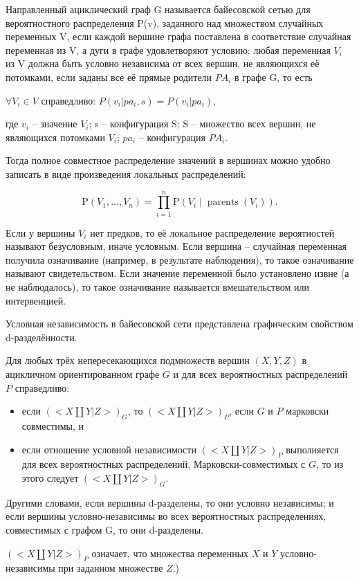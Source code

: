 Направленный ациклический граф G называется байесовской сетью для вероятностного распределения P(v), заданного над множеством случайных переменных V, если каждой вершине графа поставлена в соответствие случайная переменная из V, а дуги в графе удовлетворяют условию: любая переменная \(V_i\) из V должна быть условно независима от всех вершин, не являющихся её потомками, если заданы все её прямые родители \(PA_i\) в графе G, то есть

\(\forall V_i \in V\) справедливо: \(P(v_i|pa_i,s) = P(v_i|pa_i)\),

где \(v_i\) -- значение \(V_i\); s -- конфигурация S; S -- множество всех вершин, не являющихся потомками \(V_i\); \(pa_i\) -- конфигурация \(PA_i\).

Тогда полное совместное распределение значений в вершинах можно удобно записать в виде произведения локальных распределений:

\[ \mathrm P(V_1, \ldots, V_n) = \prod_{i=1}^n \mathrm P(V_i \mid \operatorname{parents}(V_i)). \]

Если у вершины \(V_i\) нет предков, то её локальное распределение вероятностей называют безусловным, иначе условным. Если вершина -- случайная переменная получила означивание (например, в результате наблюдения), то такое означивание называют свидетельством. Если значение переменной было установлено извне (а не наблюдалось), то такое означивание называется вмешательством или интервенцией.

Условная независимость в байесовской сети представлена графическим свойством d-разделённости.

Для любых трёх непересекающихся подмножеств вершин \( (X, Y, Z) \) в ацикличном ориентированном графе \( G \) и для всех вероятностных распределений \( P \) справедливо:
\begin{itemize}
\item если \( (<X \amalg Y|Z>)_G \), то \( (<X \amalg Y|Z>)_P \), если \( G \) и \( P \) марковски совместимы, и
\item если отношение условной независимости \( (<X \amalg Y|Z>)_P \) выполняется для всех вероятностных распределений, Марковски-совместимых с \( G \), то из этого следует \( (<X \amalg Y|Z>)_G \).
\end{itemize}
Другими словами, если вершины d-разделены, то они условно независимы; и если вершины условно-независимы во всех вероятностных распределениях, совместимых с графом G, то они d-разделены.

\( (<X \amalg Y|Z>)_P \) означает, что множества переменных \( X \) и \( Y \) условно-независимы при заданном множестве \( Z \).)

